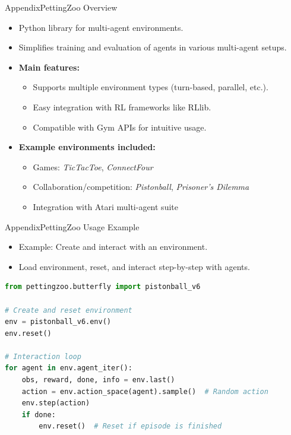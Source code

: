 \begin{frame}{Appendix}{PettingZoo Overview}
    \begin{itemize}
        \item Python library for multi-agent environments.
        \item Simplifies training and evaluation of agents in various multi-agent setups.
        \item \textbf{Main features:}
              \begin{itemize}
                  \item Supports multiple environment types (turn-based, parallel, etc.).
                  \item Easy integration with RL frameworks like RLlib.
                  \item Compatible with Gym APIs for intuitive usage.
              \end{itemize}
        \item \textbf{Example environments included:}
              \begin{itemize}
                  \item Games: \textit{TicTacToe}, \textit{ConnectFour}
                  \item Collaboration/competition: \textit{Pistonball}, \textit{Prisoner's Dilemma}
                  \item Integration with Atari multi-agent suite
              \end{itemize}
    \end{itemize}
\end{frame}

\begin{frame}[fragile]{Appendix}{PettingZoo Usage Example}
    \begin{itemize}
        \item Example: Create and interact with an environment.
        \item Load environment, reset, and interact step-by-step with agents.
    \end{itemize}
    \vspace{0.3cm}
    \begin{lstlisting}[language=Python, basicstyle=\ttfamily\small]
from pettingzoo.butterfly import pistonball_v6

# Create and reset environment
env = pistonball_v6.env()
env.reset()

# Interaction loop
for agent in env.agent_iter():
    obs, reward, done, info = env.last()
    action = env.action_space(agent).sample()  # Random action
    env.step(action)
    if done:
        env.reset()  # Reset if episode is finished
    \end{lstlisting}
\end{frame}

